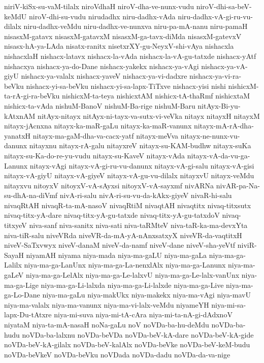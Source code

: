 {niriV-kiSx-su-vaM-tilalx
niroVdhaH
niroV-dha-ve-nunx-vudu
niroV-dhi-sa-beV-keMdU
niroV-dhi-su-vudu
nirudadhx
niru-dadhx-vAda
niru-dadhx-vA-gi-ru-vu-dilalx
niru-dadhx-veMdu
niru-dadhx-ve-nunxva
niru-pa-mA-nanu
niru-pamaH
nisasxM-gatavx
nisasxM-gatavxM
nisasxM-ga-tavx-diMda
nisasxM-gatevxV
nisasx-hA-ya-LAda
nisatx-ranitx
nisetxrXY-gu-NeyxV-shi-vAya
nishacxla
nishacxlaH
nishacx-latavx
nishacx-la-vAda
nishacx-la-vA-gu-tatxde
nishacx-yAtf
nishacxya
nishacx-ya-do-Dane
nishacx-yakekx
nishacx-ya-vAgi
nishacx-ya-vA-giyU
nishacx-ya-valalx
nishacx-yaveV
nishacx-ya-vi-dadxre
nishacx-ya-vi-ra-beVku
nishacx-yi-sa-beVku
nishacx-yi-sa-lapx-TiTxve
nishacx-yisi
nishi
nishicxM-ta-rA-gi-ra-beVku
nishicxM-ta-teya
nishicxtAM
nishicx-tA-thaRmf
nishicxtaM
nishicx-ta-vAda
nishuM-BanoV
nishuM-Ba-rige
nishuM-Baru
nitAyx-Bi-yu-kAtxnAM
nitAyx-nitayx
nitAyx-ni-tayx-va-sutx-vi-veVka
nitayx
nitayxH
nitayxM
nitayx-jAcnxna
nitayx-ka-maR-gaLu
nitayx-ka-maR-vanunx
nitayx-mA-rA-dha-yanatxH
nitayx-ma-gaM-dha-va-cacx-yatf
nitayx-meVva
nitayx-ne-nunx-vu-danunx
nitayxnu
nitayx-rA-galu
nitayxreV
nitayx-su-KAM-budhw
nitayx-suKa
nitayx-su-Ka-do-re-yu-vudu
nitayx-su-KaveV
nitayx-vAda
nitayx-vA-da-vu-ga-Lanunx
nitayx-vAgi
nitayx-vA-gi-ru-vu-danunx
nitayx-vA-gi-salu
nitayx-vA-gisi
nitayx-vA-giyU
nitayx-vA-giyeV
nitayx-vA-gu-vu-dilalx
nitayxvU
nitayx-veMdu
nitayxvu
nitoyxV
nitoyxV-vA-sAyxsi
nitoyxV-vA-sayxmf
nivARNa
nivAR-pa-Na-su-dhA-na-diVmf
nivA-ri-salu
nivA-ri-su-vu-da-kAkx-giyeV
nivaR-hi-salu
nivaqRtAH
nivaqR-ta-mA-nasoV
nivaqRtiM
nivaqtAH
nivaqtitx
nivaq-titxsutx
nivaq-titx-yA-dare
nivaq-titx-yA-gu-tatxde
nivaq-titx-yA-gu-tatxdoV
nivaq-titxyeV
niva-sanf
niva-sanitx
niva-sati
niva-taRMteV
niva-taR-ka-ma-devxYta
niva-tiR-salu
niveVRda
niveVR-da-mA-yA-nAnxsatxyX
niveVR-da-vaqtitxH
niveV-SaTxvwyx
niveV-danaM
niveV-da-namf
niveV-dane
niveV-sha-yeVtf
niviR-SayaH
niyamAH
niyama
niya-mada
niya-ma-gaLU
niya-ma-gaLa
niya-ma-ga-Lalilx
niya-ma-ga-LanUnx
niya-ma-ga-La-nenxlAlx
niya-ma-ga-Lanunx
niya-ma-gaLeV
niya-ma-ga-LelAlx
niya-ma-ga-Le-lalxvU
niya-ma-ga-Le-lalx-vanUnx
niya-ma-ga-Lige
niya-ma-ga-Li-lalxda
niya-ma-ga-Li-lalxde
niya-ma-ga-Live
niya-ma-ga-Lo-Dane
niya-ma-gaLu
niya-makUkx
niya-makekx
niya-ma-vAgi
niya-mavU
niya-ma-valalx
niya-ma-vanunx
niya-ma-vi-lalx-veMdu
niyameYH
niya-mi-sa-lapx-Du-tAtxre
niya-mi-suva
niya-mi-tA-cAra
niya-mi-ta-nA-gi-dAdxnoV
niyataM
niya-ta-mA-nasaH
noNa-gaLu
noV
noVDa-ba-hu-deMdu
noVDa-ba-hudu
noVDa-ba-lalxnu
noVDa-beVDa
noVDa-beV-kA-dare
noVDa-beV-kA-gide
noVDa-beV-kA-gilalx
noVDa-beV-kalAlx
noVDa-beVke
noVDa-beV-keM-budu
noVDa-beVkeV
noVDa-beVku
noVDada
noVDa-dadu
noVDa-da-va-nige
}
